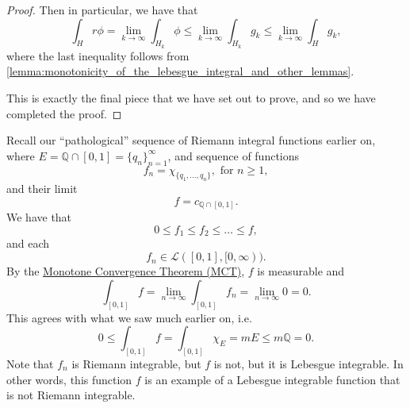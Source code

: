 \documentclass[notoc,notitlepage]{tufte-book}
\begin{document}
\begin{proof}
  Then in particular, we have that
  \begin{equation*}
    \int_{H} r \phi = \lim_{k \to \infty} \int_{H_k} \phi \leq \lim_{k \to
    \infty} \int_{H_k} g_k \leq \lim_{k \to \infty} \int_{H} g_k,
  \end{equation*}
  where the last inequality follows from
  \cref{lemma:monotonicity_of_the_lebesgue_integral_and_other_lemmas}.

  This is exactly the final piece that we have set out to prove, and so we have
  completed the proof.
\end{proof}

\begin{eg}
  Recall our ``pathological'' sequence of Riemann integral functions earlier on,
  where $E = \mathbb{Q} \cap [0, 1] = \{ q_n \}_{n=1}^{\infty}$, and sequence of
  functions
  \begin{equation*}
    f_n = \chi_{\{q_1, \ldots, q_n\}}, \text{ for } n \geq 1,
  \end{equation*}
  and their limit
  \begin{equation*}
    f = c_{\mathbb{Q} \cap [0, 1]}.
  \end{equation*}
  We have that
  \begin{equation*}
    0 \leq f_1 \leq f_2 \leq \hdots \leq f,
  \end{equation*}
  and each \sidenote{
  \begin{ex}
    Show that $f_n \in \mathcal{L}([0, 1], [0, \infty))$.
  \end{ex}
  }
  \begin{equation*}
    f_n \in \mathcal{L}([0, 1], [0, \infty)).
  \end{equation*}
  By the \hyperref[thm:the_monotone_convergence_theorem]{Monotone Convergence
  Theorem (MCT)}, $f$ is measurable and
  \begin{equation*}
    \int_{[0, 1]} f = \lim_{n \to \infty} \int_{[0, 1]} f_n = \lim_{n \to
    \infty} 0 = 0.
  \end{equation*}
  This agrees with what we saw much earlier on, i.e.
  \begin{equation*}
    0 \leq \int_{[0, 1]} f = \int_{[0, 1]} \chi_E = mE \leq m\mathbb{Q} = 0.
  \end{equation*}
  Note that $f_n$ is Riemann integrable, but $f$ is not, but it is Lebesgue
  integrable. In other words, this function $f$ is an example of a Lebesgue
  integrable function that is not Riemann integrable.
\end{eg}
\end{document}
